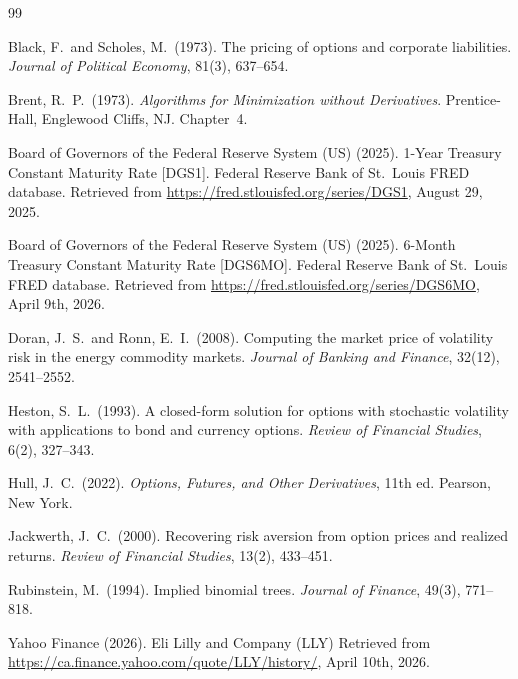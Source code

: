 \documentclass[12pt, a4paper]{article}
\begin{document}

\begin{thebibliography}{99}

Black, F.\ and Scholes, M.\ (1973).
The pricing of options and corporate liabilities.
\textit{Journal of Political Economy}, 81(3), 637--654.

Brent, R.\ P.\ (1973).
\textit{Algorithms for Minimization without Derivatives}.
Prentice-Hall, Englewood Cliffs, NJ. Chapter~4.

Board of Governors of the Federal Reserve System (US) (2025).
1-Year Treasury Constant Maturity Rate [DGS1].
Federal Reserve Bank of St.\ Louis FRED database.
Retrieved from \url{https://fred.stlouisfed.org/series/DGS1}, August 29, 2025.

Board of Governors of the Federal Reserve System (US) (2025).
6-Month Treasury Constant Maturity Rate [DGS6MO].
Federal Reserve Bank of St.\ Louis FRED database.
Retrieved from \url{https://fred.stlouisfed.org/series/DGS6MO}, April 9th, 2026.

Doran, J.\ S.\ and Ronn, E.\ I.\ (2008).
Computing the market price of volatility risk in the energy commodity markets.
\textit{Journal of Banking and Finance}, 32(12), 2541--2552.

Heston, S.\ L.\ (1993).
A closed-form solution for options with stochastic volatility with applications to bond
and currency options.
\textit{Review of Financial Studies}, 6(2), 327--343.

Hull, J.\ C.\ (2022).
\textit{Options, Futures, and Other Derivatives}, 11th ed.
Pearson, New York.

Jackwerth, J.\ C.\ (2000).
Recovering risk aversion from option prices and realized returns.
\textit{Review of Financial Studies}, 13(2), 433--451.

Rubinstein, M.\ (1994).
Implied binomial trees.
\textit{Journal of Finance}, 49(3), 771--818.

Yahoo Finance (2026).
Eli Lilly and Company (LLY)
Retrieved from \url{https://ca.finance.yahoo.com/quote/LLY/history/}, April 10th, 2026.

\end{thebibliography}
\end{document}
